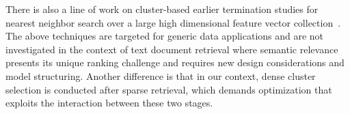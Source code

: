 There is also a line of work on cluster-based earlier termination studies for nearest neighbor search over a large   high dimensional 
feature vector collection~\cite{2020SIGMOD-ANNadaptive,2023USENIX-ANNcluster}.
The above techniques are targeted for generic data applications and  are not investigated in the context of text document  retrieval where
semantic  relevance presents   its unique ranking challenge and  
requires new design considerations and model structuring.  Another difference is that in our context,
dense cluster selection is conducted after sparse retrieval, which demands optimization that  exploits the interaction  between
these two stages.


